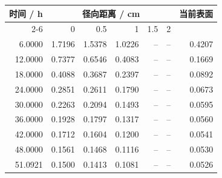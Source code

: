 \begin{tabular}{rrrrrrr}
\toprule
时间 / h & \multicolumn{5}{c}{径向距离 / cm} & 当前表面 \\
\cmidrule(lr){2-6}
 & 0 & 0.5 & 1 & 1.5 & 2 & \\
\midrule
6.0000 & 1.7196 & 1.5378 & 1.0226 & -- & -- & 0.4207 \\
12.0000 & 0.7377 & 0.6546 & 0.4083 & -- & -- & 0.1669 \\
18.0000 & 0.4088 & 0.3687 & 0.2397 & -- & -- & 0.0892 \\
24.0000 & 0.2851 & 0.2611 & 0.1790 & -- & -- & 0.0673 \\
30.0000 & 0.2263 & 0.2094 & 0.1493 & -- & -- & 0.0595 \\
36.0000 & 0.1928 & 0.1797 & 0.1317 & -- & -- & 0.0560 \\
42.0000 & 0.1712 & 0.1604 & 0.1200 & -- & -- & 0.0541 \\
48.0000 & 0.1561 & 0.1468 & 0.1116 & -- & -- & 0.0530 \\
51.0921 & 0.1500 & 0.1413 & 0.1081 & -- & -- & 0.0526 \\
\bottomrule
\end{tabular}
